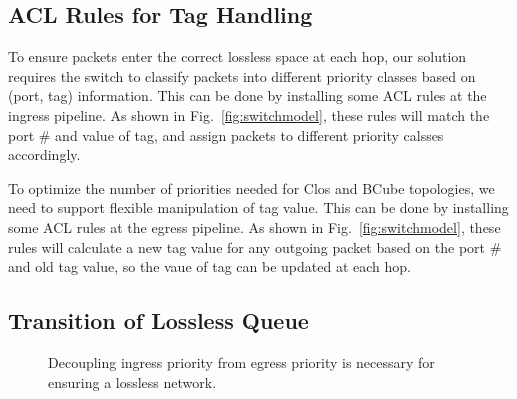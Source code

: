 \subsection{ACL Rules for Tag Handling}\label{subsec:acl}

To ensure packets enter the correct lossless space at each hop, our solution requires the switch to classify packets into different priority classes based on  (port, tag) information. This can be done by installing some ACL rules at the ingress pipeline. As shown in Fig.~\ref{fig:switchmodel}, these rules will match the port $\#$ and value of tag, and assign packets to different priority calsses accordingly.

To optimize the number of priorities needed for Clos and BCube topologies, we need to support flexible manipulation of tag value.  This can be done by installing some ACL rules at the egress pipeline. As shown in Fig.~\ref{fig:switchmodel}, these rules will calculate a new tag value for any outgoing packet based on the port $\#$ and old tag value, so the vaue of tag can be updated at each hop.

\subsection{Transition of Lossless Queue}\label{subsec:change_priority}

\begin{figure}[t]
	\centering
	

	\vspace{-0.15in}

	\vspace{-0.15in}
	
	
	\caption{Decoupling ingress priority from egress priority is necessary for ensuring a lossless network.}\label{fig:queuetransition}
	
\end{figure}

